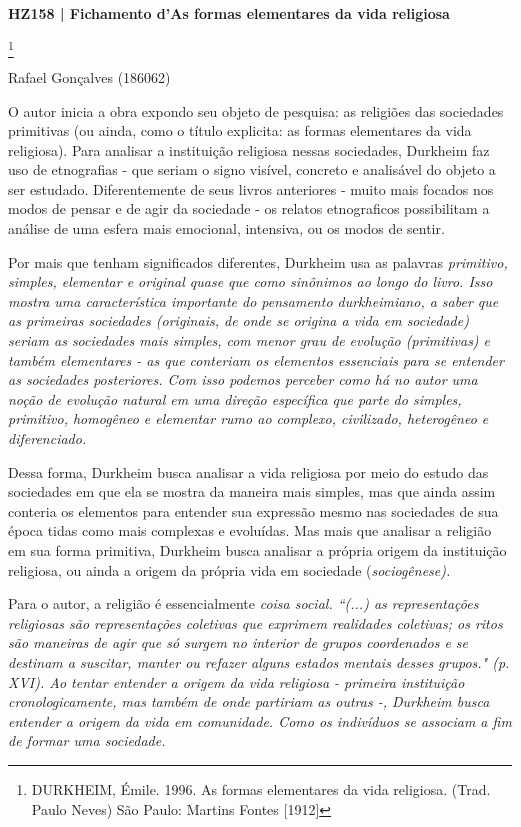 \documentclass[12pt,a4paper]{article}
\begin{document}
\noindent
\centerline{\large\textbf{HZ158 | Fichamento d'As formas elementares da vida religiosa}}\footnote{DURKHEIM, Émile. 1996. As formas elementares da vida religiosa. (Trad. Paulo Neves) São Paulo: Martins Fontes [1912]}
\centerline{\large Rafael Gonçalves (186062)}
\break
\noindent
O autor inicia a obra expondo seu objeto de pesquisa: as religiões das sociedades primitivas (ou ainda, como o título explicita: as formas elementares da vida religiosa). Para analisar a instituição religiosa nessas sociedades, Durkheim faz uso de etnografias - que seriam o signo visível, concreto e analisável do objeto a ser estudado. Diferentemente de seus livros anteriores - muito mais focados nos modos de pensar e de agir da sociedade - os relatos etnograficos possibilitam a análise de uma esfera mais emocional, intensiva, ou os modos de sentir.

Por mais que tenham significados diferentes, Durkheim usa as palavras \em primitivo\em , \em simples\em , \em elementar \em e \em original \em quase que como sinônimos ao longo do livro. Isso mostra uma característica importante do pensamento durkheimiano, a saber que as primeiras sociedades (originais, de onde se origina a vida em sociedade) seriam as sociedades mais simples, com menor grau de evolução (primitivas) e também elementares - as que conteriam os elementos essenciais para se entender as sociedades posteriores. Com isso podemos perceber como há no autor uma noção de evolução \em natural \em em uma direção específica que parte do simples, primitivo, homogêneo e elementar rumo ao complexo, civilizado, heterogêneo e diferenciado.

Dessa forma, Durkheim busca analisar a vida religiosa por meio do estudo das sociedades em que ela se mostra da maneira mais simples, mas que ainda assim conteria os elementos para entender sua expressão mesmo nas sociedades de sua época tidas como mais complexas e evoluídas. Mas mais que analisar a religião em sua forma primitiva, Durkheim busca analisar a própria origem da instituição religiosa, ou ainda a origem da própria vida em sociedade (\em sociogênese\em ).

Para o autor, a religião é essencialmente \em coisa social\em .
``(...) as representações religiosas são representações coletivas que exprimem realidades coletivas; os ritos são maneiras de agir que só surgem no interior de grupos coordenados e se destinam a suscitar, manter ou refazer alguns estados mentais desses grupos." (p. XVI).
Ao tentar entender a origem da vida religiosa - primeira instituição cronologicamente, mas também de onde partiriam as outras -, Durkheim busca entender a origem da vida em comunidade. Como os indivíduos se associam a fim de formar uma sociedade.
\end{document}
